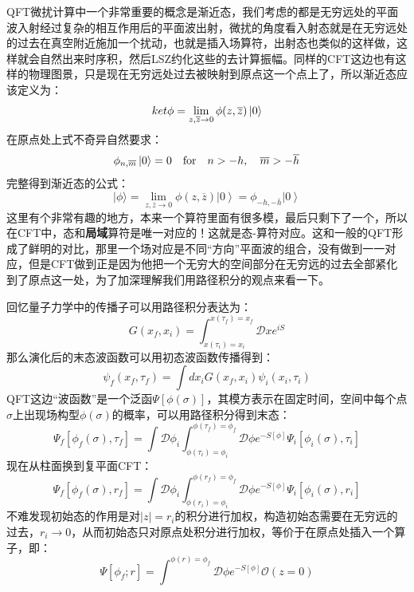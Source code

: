 QFT微扰计算中一个非常重要的概念是渐近态，我们考虑的都是无穷远处的平面波入射经过复杂的相互作用后的平面波出射，微扰的角度看入射态就是在无穷远处的过去在真空附近施加一个扰动，也就是插入场算符，出射态也类似的这样做，这样就会自然出来时序积，然后LSZ约化这些的去计算振幅。同样的CFT这边也有这样的物理图景，只是现在无穷远处过去被映射到原点这一个点上了，所以渐近态应该定义为：
\begin{equation}
	ket{\phi}=\lim_{z,\overline{z}\to0}\phi(z,\overline{z})\ket{0}
\end{equation}
在原点处上式不奇异自然要求：
\begin{equation}\label{eq:30.6}
	\phi_{n,\overline{m}}\ket{0} =0\quad\text{for}\quad n>-h,\quad\overline{m}>-\overline{h}
\end{equation}
完整得到渐近态的公式：
\begin{equation}
	\boxed{|\phi\rangle=\lim\limits_{z,\overline{z}\to0}\phi(z,\overline{z})\left|0\right\rangle=\phi_{-h,-\overline{h}}\left|0\right\rangle}
\end{equation}
这里有个非常有趣的地方，本来一个算符里面有很多模，最后只剩下了一个，所以在CFT中，态和\textbf{局域}算符是唯一对应的！这就是态\mbox{-}算符对应。这和一般的QFT形成了鲜明的对比，那里一个场对应是不同“方向”平面波的组合，没有做到一一对应，但是CFT做到正是因为他把一个无穷大的空间部分在无穷远的过去全部紧化到了原点这一处，为了加深理解我们用路径积分的观点来看一下。

回忆量子力学中的传播子可以用路径积分表达为：
\begin{equation}
	G(x_f,x_i)=\int_{x(\tau_i)=x_i}^{x(\tau_f)=x_f}\mathcal{D}xe^{iS}
\end{equation}
那么演化后的末态波函数可以用初态波函数传播得到：
\begin{equation}
	\psi_{f}(x_{f},\tau_{f})=\int dx_{i}G(x_{f},x_{i})\psi_{i}(x_{i},\tau_{i})
\end{equation}
QFT这边“波函数”是一个泛函$\Psi[\phi(\sigma)]$，其模方表示在固定时间，空间中每个点$\sigma$上出现场构型$\phi(\sigma)$的概率，可以用路径积分得到末态：
\begin{equation}
	\Psi_f[\phi_f(\sigma),\tau_f]=\int\mathcal{D}\phi_i\int_{\phi(\tau_i)=\phi_i}^{\phi(\tau_f)=\phi_f}\mathcal{D}\phi e^{-S[\phi]}\Psi_i[\phi_i(\sigma),\tau_i]
\end{equation}
现在从柱面换到复平面CFT：
\begin{equation}
	\Psi_f[\phi_f(\sigma),r_f]=\int\mathcal{D}\phi_i\int_{\phi(r_i)=\phi_i}^{\phi(r_f)=\phi_f}\mathcal{D}\phi e^{-S[\phi]}\Psi_i[\phi_i(\sigma),r_i]
\end{equation}
不难发现初始态的作用是对$|z|=r_i$的积分进行加权，构造初始态需要在无穷远的过去，$r_i\to 0$，从而初始态只对原点处积分进行加权，等价于在原点处插入一个算子，即：
\begin{equation}
	\Psi[\phi_f;r]=\int^{\phi(r)=\phi_f}\mathcal{D}\phi e^{-S[\phi]}\mathcal{O}(z=0)
\end{equation}


